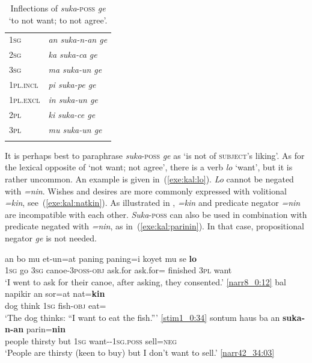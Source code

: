 \documentclass[output=paper,colorlinks,citecolor=brown,draft]{langscibook}
\begin{document}
\begin{table}
	\caption{Inflections of \textit{suka}-\textsc{poss} \textit{ge} `to not want; to not agree'.}
	\label{tab:kal:sukaungge}
	\begin{tabular}{ll} 
		\lsptoprule
			\textsc{1sg} & \textit{an suka-n-an ge}\\
			\textsc{2sg}& \textit{ka suka-ca ge}\\
			\textsc{3sg}& \textit{ma suka-un ge}\\
			\textsc{1pl.incl}& \textit{pi suka-pe ge}\\
			\textsc{1pl.excl}& \textit{in suka-un ge}\\
			\textsc{2pl} &\textit{ki suka-ce ge}\\
			\textsc{3pl}& \textit{mu suka-un ge}\\
		\lspbottomrule
	\end{tabular}
\end{table}

It is perhaps best to paraphrase \textit{suka}-\textsc{poss} \textit{ge} as `is not of \textsc{subject}'s liking'. As for the lexical opposite of `not want; not agree', there is a verb \textit{lo} `want', but it is rather uncommon. An example is given in~(\ref{exe:kal:lo}). \textit{Lo} cannot be negated with \textit{=nin}. Wishes and desires are more commonly expressed with volitional \textit{=kin}, see~(\ref{exe:kal:natkin}). As illustrated in , \textit{=kin} and predicate negator \textit{=nin} are incompatible with each other. \textit{Suka}-\textsc{poss} can also be used in combination with predicate negated with \textit{=nin}, as in~(\ref{exe:kal:parinin}). In that case, propositional negator \textit{ge} is not needed.


\ea 
\ea \label{exe:kal:lo}
\gll an bo mu et-un=at paning paning=i koyet mu se \textbf{lo}\\
\textsc{1sg} go \textsc{3sg} canoe-\textsc{3poss-obj} ask.for ask.for={\gli} finished \textsc{3pl} {\glse} want\\
\glt `I went to ask for their canoe, after asking, they consented.' {\href{http://hdl.handle.net/10050/00-0000-0000-0004-1C99-E}{[narr8\_0:12]}}
\ex \label{exe:kal:natkin}
\gll bal napikir an sor=at nat=\textbf{kin}\\
dog think \textsc{1sg} fish-\textsc{obj} eat={\glkin}\\
\glt `The dog thinks: ``I want to eat the fish.''' {\href{http://hdl.handle.net/10050/00-0000-0000-0004-1BB9-6}{[stim1\_0:34]}}
\ex \label{exe:kal:parinin}
\gll sontum haus ba an \textbf{suka-n-an} parin=\textbf{nin}\\
people thirsty but \textsc{1sg} want-{\glnn}-\textsc{1sg.poss} sell=\textsc{neg}\\
\glt `People are thirsty (keen to buy) but I don't want to sell.' {\href{http://hdl.handle.net/10050/00-0000-0000-0004-1BDD-5}{[narr42\_34:03]}}
\z \z 
	
\end{document}
